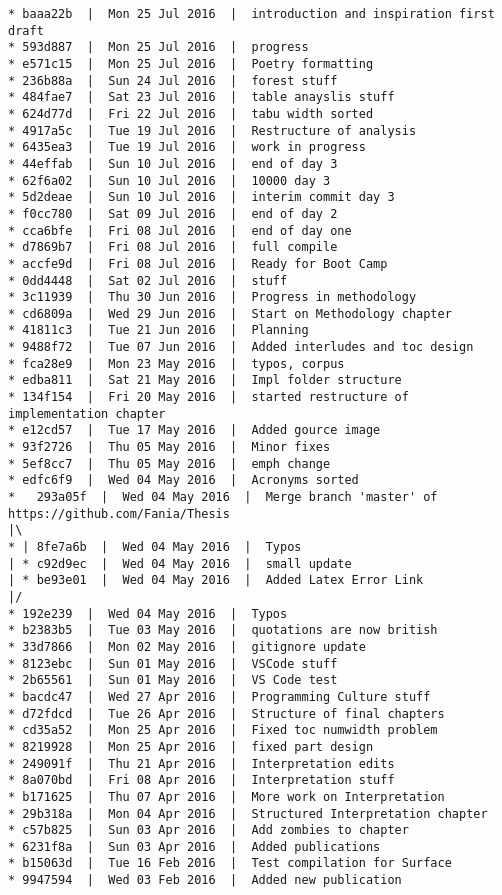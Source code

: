 \begin{verbatim}
* baaa22b  |  Mon 25 Jul 2016  |  introduction and inspiration first draft
* 593d887  |  Mon 25 Jul 2016  |  progress
* e571c15  |  Mon 25 Jul 2016  |  Poetry formatting
* 236b88a  |  Sun 24 Jul 2016  |  forest stuff
* 484fae7  |  Sat 23 Jul 2016  |  table anayslis stuff
* 624d77d  |  Fri 22 Jul 2016  |  tabu width sorted
* 4917a5c  |  Tue 19 Jul 2016  |  Restructure of analysis
* 6435ea3  |  Tue 19 Jul 2016  |  work in progress
* 44effab  |  Sun 10 Jul 2016  |  end of day 3
* 62f6a02  |  Sun 10 Jul 2016  |  10000 day 3
* 5d2deae  |  Sun 10 Jul 2016  |  interim commit day 3
* f0cc780  |  Sat 09 Jul 2016  |  end of day 2
* cca6bfe  |  Fri 08 Jul 2016  |  end of day one
* d7869b7  |  Fri 08 Jul 2016  |  full compile
* accfe9d  |  Fri 08 Jul 2016  |  Ready for Boot Camp
* 0dd4448  |  Sat 02 Jul 2016  |  stuff
* 3c11939  |  Thu 30 Jun 2016  |  Progress in methodology
* cd6809a  |  Wed 29 Jun 2016  |  Start on Methodology chapter
* 41811c3  |  Tue 21 Jun 2016  |  Planning
* 9488f72  |  Tue 07 Jun 2016  |  Added interludes and toc design
* fca28e9  |  Mon 23 May 2016  |  typos, corpus
* edba811  |  Sat 21 May 2016  |  Impl folder structure
* 134f154  |  Fri 20 May 2016  |  started restructure of implementation chapter
* e12cd57  |  Tue 17 May 2016  |  Added gource image
* 93f2726  |  Thu 05 May 2016  |  Minor fixes
* 5ef8cc7  |  Thu 05 May 2016  |  emph change
* edfc6f9  |  Wed 04 May 2016  |  Acronyms sorted
*   293a05f  |  Wed 04 May 2016  |  Merge branch 'master' of https://github.com/Fania/Thesis
|\  
* | 8fe7a6b  |  Wed 04 May 2016  |  Typos
| * c92d9ec  |  Wed 04 May 2016  |  small update
| * be93e01  |  Wed 04 May 2016  |  Added Latex Error Link
|/  
* 192e239  |  Wed 04 May 2016  |  Typos
* b2383b5  |  Tue 03 May 2016  |  quotations are now british
* 33d7866  |  Mon 02 May 2016  |  gitignore update
* 8123ebc  |  Sun 01 May 2016  |  VSCode stuff
* 2b65561  |  Sun 01 May 2016  |  VS Code test
* bacdc47  |  Wed 27 Apr 2016  |  Programming Culture stuff
* d72fdcd  |  Tue 26 Apr 2016  |  Structure of final chapters
* cd35a52  |  Mon 25 Apr 2016  |  Fixed toc numwidth problem
* 8219928  |  Mon 25 Apr 2016  |  fixed part design
* 249091f  |  Thu 21 Apr 2016  |  Interpretation edits
* 8a070bd  |  Fri 08 Apr 2016  |  Interpretation stuff
* b171625  |  Thu 07 Apr 2016  |  More work on Interpretation
* 29b318a  |  Mon 04 Apr 2016  |  Structured Interpretation chapter
* c57b825  |  Sun 03 Apr 2016  |  Add zombies to chapter
* 6231f8a  |  Sun 03 Apr 2016  |  Added publications
* b15063d  |  Tue 16 Feb 2016  |  Test compilation for Surface
* 9947594  |  Wed 03 Feb 2016  |  Added new publication

\end{verbatim}
